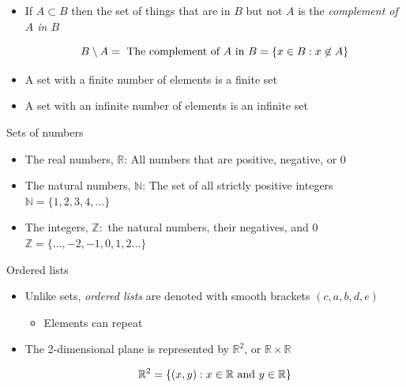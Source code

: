 \documentclass[10pt]{seminar}
\begin{document}
\begin{slide}
\begin{itemize}
\ \\The set $\{S: S\subset Y \text{ and } x\in S\}$ has $2^n$ elements: it is $\{S:  S=\{x\}\cup Z \text{ where } Z\in 2^X\}$.  Thus, $|2^Y| = 2^n+2^n=2*2^n=2^{n+1}$. This proves our result. $\Box$

\newslide

\item If $A\subset B$ then the set of things that are in $B$ but not $A$ is the \textit{complement of $A$ in $B$}

$$B\setminus A= \hbox{ The complement of $A$ in $B$} = \{x\in B: x\not\in A\}$$

\item A set with a finite number of elements is a finite set

\item A set with an infinite number of elements is an infinite set
\end{itemize}



\newslide Sets of numbers

\begin{itemize}
\item The real numbers, $\mathbb{R}$: All numbers that are positive, negative, or 0

\item The natural numbers, $\mathbb{N}$: The set of all strictly positive integers \\$\mathbb{N}=\{1, 2, 3, 4, ...\}$

\item The integers, $\mathbb{Z}: $ the natural numbers, their negatives, and 0\\$\mathbb{Z}=\{..., -2, -1, 0, 1, 2 ...\}$

\end{itemize}

\newslide

Ordered lists

\begin{itemize}
\item  Unlike sets, \textit{ordered lists} are denoted with smooth brackets $(c, a, b, d, e)$
\begin{itemize}
\item Elements can repeat
\end{itemize}
\item The 2-dimensional plane is represented by $\mathbb{R}^2$, or $\mathbb{R}\times \mathbb{R}$


$$\mathbb{R}^2=\{(x, y): x\in \mathbb{R} \hbox{ and }y\in \mathbb{R} \}$$


\end{itemize}
\end{slide}
\end{document}
